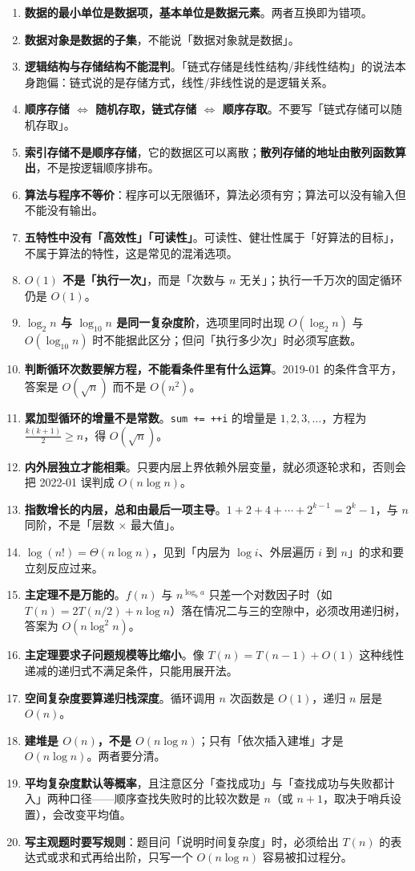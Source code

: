 \documentclass[11pt,openany,UTF8]{ctexbook}
\begin{document}
\begin{enumerate}
\item \textbf{数据的最小单位是数据项，基本单位是数据元素}。两者互换即为错项。
\item \textbf{数据对象是数据的子集}，不能说「数据对象就是数据」。
\item \textbf{逻辑结构与存储结构不能混判}。「链式存储是线性结构/非线性结构」的说法本身跑偏：链式说的是存储方式，线性/非线性说的是逻辑关系。
\item \textbf{顺序存储 $\Leftrightarrow$ 随机存取，链式存储 $\Leftrightarrow$ 顺序存取}。不要写「链式存储可以随机存取」。
\item \textbf{索引存储不是顺序存储}，它的数据区可以离散；\textbf{散列存储的地址由散列函数算出}，不是按逻辑顺序排布。
\item \textbf{算法与程序不等价}：程序可以无限循环，算法必须有穷；算法可以没有输入但不能没有输出。
\item \textbf{五特性中没有「高效性」「可读性」}。可读性、健壮性属于「好算法的目标」，不属于算法的特性，这是常见的混淆选项。
\item \textbf{$O(1)$ 不是「执行一次」}，而是「次数与 $n$ 无关」；执行一千万次的固定循环仍是 $O(1)$。
\item \textbf{$\log_2 n$ 与 $\log_{10} n$ 是同一复杂度阶}，选项里同时出现 $O(\log_2 n)$ 与 $O(\log_{10} n)$ 时不能据此区分；但问「执行多少次」时必须写底数。
\item \textbf{判断循环次数要解方程，不能看条件里有什么运算}。2019-01 的条件含平方，答案是 $O(\sqrt n)$ 而不是 $O(n^2)$。
\item \textbf{累加型循环的增量不是常数}。\texttt{sum +\allowbreak{}=\allowbreak{} +\allowbreak{}+\allowbreak{}i} 的增量是 $1,2,3,\dots$，方程为 $\frac{k(k+1)}2 \ge n$，得 $O(\sqrt n)$。
\item \textbf{内外层独立才能相乘}。只要内层上界依赖外层变量，就必须逐轮求和，否则会把 2022-01 误判成 $O(n\log n)$。
\item \textbf{指数增长的内层，总和由最后一项主导}。$1+2+4+\cdots+2^{k-1}=2^k-1$，与 $n$ 同阶，不是「层数 $\times$ 最大值」。
\item \textbf{$\log(n!)=\Theta(n\log n)$}，见到「内层为 $\log i$、外层遍历 $i$ 到 $n$」的求和要立刻反应过来。
\item \textbf{主定理不是万能的}。$f(n)$ 与 $n^{\log_b a}$ 只差一个对数因子时（如 $T(n)=2T(n/2)+n\log n$）落在情况二与三的空隙中，必须改用递归树，答案为 $O(n\log^2 n)$。
\item \textbf{主定理要求子问题规模等比缩小}。像 $T(n)=T(n-1)+O(1)$ 这种线性递减的递归式不满足条件，只能用展开法。
\item \textbf{空间复杂度要算递归栈深度}。循环调用 $n$ 次函数是 $O(1)$，递归 $n$ 层是 $O(n)$。
\item \textbf{建堆是 $O(n)$，不是 $O(n\log n)$}；只有「依次插入建堆」才是 $O(n\log n)$。两者要分清。
\item \textbf{平均复杂度默认等概率}，且注意区分「查找成功」与「查找成功与失败都计入」两种口径——顺序查找失败时的比较次数是 $n$（或 $n+1$，取决于哨兵设置），会改变平均值。
\item \textbf{写主观题时要写规则}：题目问「说明时间复杂度」时，必须给出 $T(n)$ 的表达式或求和式再给出阶，只写一个 $O(n\log n)$ 容易被扣过程分。
\end{enumerate}
\end{document}
